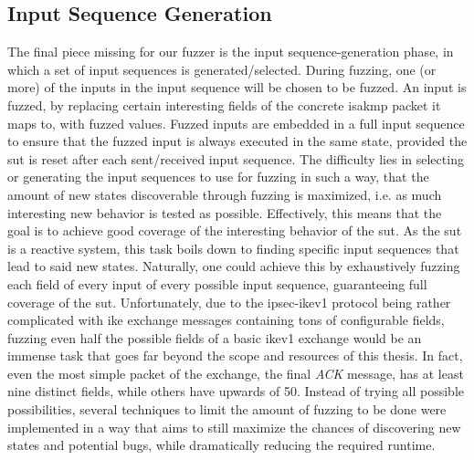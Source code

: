 \subsection{Input Sequence Generation} \label{subsec:sequence_generation}
The final piece missing for our fuzzer is the input sequence-generation phase, in which a set of input sequences is generated/selected. During fuzzing, one (or more) of the inputs in the input sequence will be chosen to be fuzzed. An input is fuzzed, by replacing certain interesting fields of the concrete \ac{isakmp} packet it maps to, with fuzzed values. Fuzzed inputs are embedded in a full input sequence to ensure that the fuzzed input is always executed in the same state, provided the \ac{sut} is reset after each sent/received input sequence. The difficulty lies in selecting or generating the input sequences to use for fuzzing in such a way, that the amount of new states discoverable through fuzzing is maximized, i.e. as much interesting new behavior is tested as possible. Effectively, this means that the goal is to achieve good coverage of the interesting behavior of the \ac{sut}. As the \ac{sut} is a reactive system, this task boils down to finding specific input sequences that lead to said new states. Naturally, one could achieve this by exhaustively fuzzing each field of every input of every possible input sequence, guaranteeing full coverage of the \ac{sut}. Unfortunately, due to the \ac{ipsec}-\ac{ike}v1 protocol being rather complicated with \ac{ike} exchange messages containing tons of configurable fields, fuzzing even half the possible fields of a basic \ac{ike}v1 exchange would be an immense task that goes far beyond the scope and resources of this thesis. In fact, even the most simple packet of the exchange, the final \emph{ACK} message, has at least nine distinct fields, while others have upwards of 50. Instead of trying all possible possibilities, several techniques to limit the amount of fuzzing to be done were implemented in a way that aims to still maximize the chances of discovering new states and potential bugs, while dramatically reducing the required runtime. 


